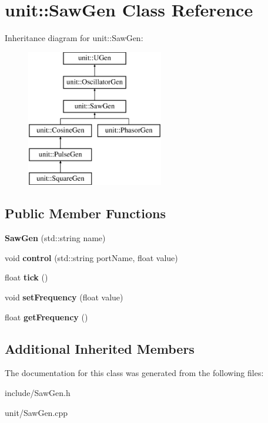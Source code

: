 \hypertarget{classunit_1_1SawGen}{}\section{unit\+:\+:Saw\+Gen Class Reference}
\label{classunit_1_1SawGen}
Inheritance diagram for unit\+:\+:Saw\+Gen\+:\begin{figure}[H]
\begin{center}
\leavevmode
\includegraphics[height=6.000000cm]{classunit_1_1SawGen}
\end{center}
\end{figure}
\subsection*{Public Member Functions}
\begin{DoxyCompactItemize}
\item 
{\bfseries Saw\+Gen} (std\+::string name)\hypertarget{classunit_1_1SawGen_a24c35afc1bdb237a8a5d1eb3888ce0bc}{}\label{classunit_1_1SawGen_a24c35afc1bdb237a8a5d1eb3888ce0bc}

\item 
void {\bfseries control} (std\+::string port\+Name, float value)\hypertarget{classunit_1_1SawGen_a515f6eb82a1a97ee434144b8c58133b8}{}\label{classunit_1_1SawGen_a515f6eb82a1a97ee434144b8c58133b8}

\item 
float {\bfseries tick} ()\hypertarget{classunit_1_1SawGen_a18c6704aec8f20a5605ff72d674c7516}{}\label{classunit_1_1SawGen_a18c6704aec8f20a5605ff72d674c7516}

\item 
void {\bfseries set\+Frequency} (float value)\hypertarget{classunit_1_1SawGen_a1a77058c93e7f7b3fe4b355953674678}{}\label{classunit_1_1SawGen_a1a77058c93e7f7b3fe4b355953674678}

\item 
float {\bfseries get\+Frequency} ()\hypertarget{classunit_1_1SawGen_a0f08973bebb28aa1a059ccce09e5ebdf}{}\label{classunit_1_1SawGen_a0f08973bebb28aa1a059ccce09e5ebdf}

\end{DoxyCompactItemize}
\subsection*{Additional Inherited Members}


The documentation for this class was generated from the following files\+:\begin{DoxyCompactItemize}
\item 
include/Saw\+Gen.\+h\item 
unit/Saw\+Gen.\+cpp\end{DoxyCompactItemize}
